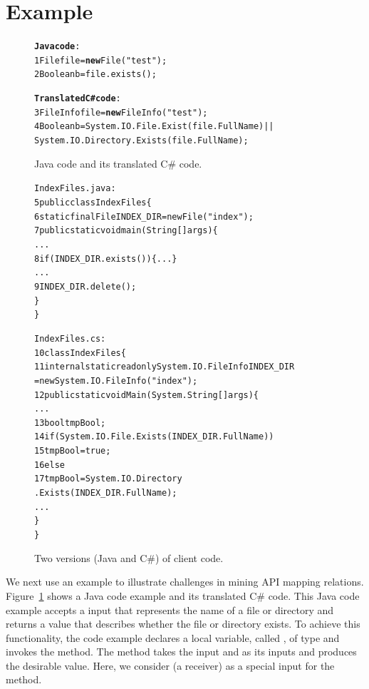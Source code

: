 \section{Example}
\label{sec:example}

\begin{figure}[t]
\begin{CodeOut}
\begin{alltt}
\textbf{Java code}:
1  File file = \textbf{new} File("test");
2  Boolean b = file.exists();

\textbf{Translated C\# code}:
3  FileInfo file = \textbf{new} FileInfo("test");
4  Boolean b = System.IO.File.Exist(file.FullName)||
           System.IO.Directory.Exists(file.FullName);
\end{alltt}
\end{CodeOut}\vspace*{-4ex}
\caption{\label{fig:challenge}Java code and its translated C\# code.}%
\end{figure}
\begin{figure}[t]
\begin{CodeOut}\vspace*{-1ex}
\begin{alltt}
  IndexFiles.java:
5 public class IndexFiles \{
6   static final File INDEX_DIR = new File("index");
7   public static void main(String[] args) \{
      ...
8     if (INDEX_DIR.exists()) \{...\}
      ...
9       INDEX_DIR.delete();
    \}
  \}

  IndexFiles.cs:
10 class IndexFiles\{
11   internal static readonly System.IO.FileInfo INDEX_DIR
          = new System.IO.FileInfo("index");
12   public static void  Main(System.String[] args)\{
      ...
13     bool tmpBool;
14     if (System.IO.File.Exists(INDEX_DIR.FullName))
15       tmpBool = true;
16    else
17       tmpBool = System.IO.Directory
                         .Exists(INDEX_DIR.FullName);
      ...
    \}
 \}
\end{alltt}
\end{CodeOut}\vspace*{-4ex}
\caption{\label{fig:clientcode} Two versions (Java and C\#) of
client code.}\vspace*{-2ex}
\end{figure}

We next use an example to illustrate challenges in mining
API mapping relations. Figure~\ref{fig:challenge} shows a
Java code example and its translated C\# code. This Java code
example accepts a  input that represents the name of a
file or directory and returns a  value that
describes whether the file or directory exists. To achieve this functionality, the
code example declares a local variable, called , of
type  and invokes the  method. The
method takes the  input and  as its
inputs and produces the desirable  value. Here, we
consider  (a receiver) as a special input for
the  method.

